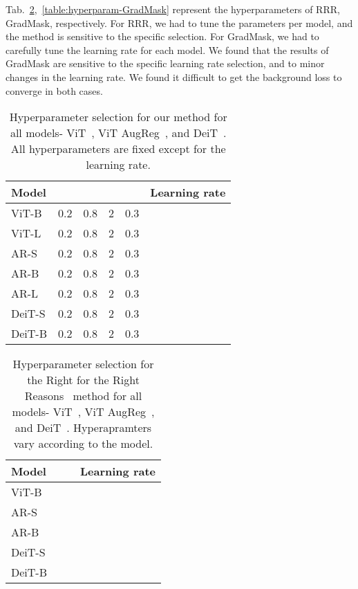 \documentclass{article}
\begin{document}
Tab.~\ref{table:hyperparam-RRR},~\ref{table:hyperparam-GradMask} represent the hyperparameters of RRR, GradMask, respectively. For RRR, we had to tune the parameters per model, and the method is sensitive to the specific selection. For GradMask, we had to carefully tune the learning rate for each model. We found that the results of GradMask are sensitive to the specific learning rate selection, and to minor changes in the learning rate. We found it difficult to get the background loss to converge in both cases.
\begin{table}[h!]
\caption{
    Hyperparameter selection for our method for all models- ViT~\cite{dosovitskiy2020image}, ViT AugReg~\cite{Steiner2021HowTT}, and DeiT~\cite{touvron2020training}. All hyperparameters are fixed except for the learning rate.
    }
\begin{center}
\begin{tabular}{@{}l@{~~~}c@{~~~~}c@{~~~~}c@{~~~~}c@{~~~~}c@{}}
        \toprule
        Model&  &   &  & & Learning rate \\
        \midrule
        ViT-B & 0.2 & 0.8 & 2 & 0.3 & \\
        \midrule
        ViT-L & 0.2 & 0.8 & 2 & 0.3 & \\
        \midrule
        AR-S & 0.2 & 0.8 & 2 & 0.3 & \\
        \midrule
        AR-B & 0.2 & 0.8 & 2 & 0.3 & \\
        \midrule
        AR-L & 0.2 & 0.8 & 2 & 0.3 & \\
        \midrule
        DeiT-S & 0.2 & 0.8 & 2 & 0.3 & \\
        \midrule
        DeiT-B & 0.2 & 0.8 & 2 & 0.3 & \\
        \bottomrule
    \end{tabular}
\smallskip
    \smallskip
    \label{table:hyperparam-ours}
    \end{center}
\end{table}

\begin{table}[h!]
\caption{
    Hyperparameter selection for the Right for the Right Reasons~\cite{Ross2017RightFT} method for all models- ViT~\cite{dosovitskiy2020image}, ViT AugReg~\cite{Steiner2021HowTT}, and DeiT~\cite{touvron2020training}. Hyperapramters vary according to the model.
    }
\begin{center}
\begin{tabular}{@{}l@{~~~}c@{~~~~}c@{~~~~}c@{}}
        \toprule
        Model&  &  & Learning rate \\
        \midrule
        ViT-B &  &  &  \\
        \midrule
        AR-S &  &  &  \\
        \midrule
        AR-B &  &  &   \\
        \midrule
        DeiT-S &  &  &    \\
        \midrule
        DeiT-B &  &  &   \\
        \bottomrule
    \end{tabular}
\smallskip
    \smallskip
    \label{table:hyperparam-RRR}
    \end{center}
\end{table}
\end{document}
